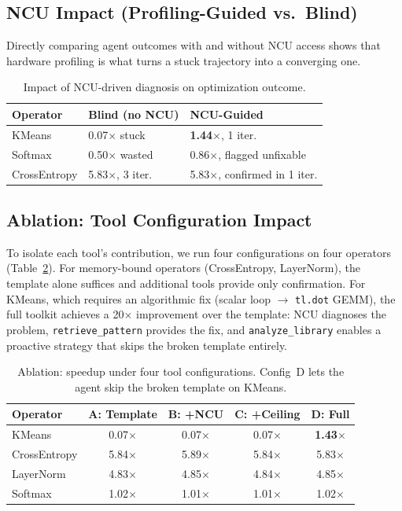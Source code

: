 \documentclass[sigconf,nonacm]{acmart}
\begin{document}
\subsection{NCU Impact (Profiling-Guided vs.\ Blind)}

Directly comparing agent outcomes with and without NCU access
shows that hardware profiling is what turns a stuck trajectory
into a converging one.

\begin{table}[h]
\centering
\caption{Impact of NCU-driven diagnosis on optimization outcome.}
\label{tab:ncu-impact}
\setlength{\tabcolsep}{3.5pt}
\small
\begin{tabular}{lll}
\toprule
Operator & Blind (no NCU) & NCU-Guided \\
\midrule
KMeans       & 0.07$\times$ stuck   & \textbf{1.44$\times$}, 1 iter. \\
Softmax      & 0.50$\times$ wasted  & 0.86$\times$, flagged unfixable \\
CrossEntropy & 5.83$\times$, 3 iter.& 5.83$\times$, confirmed in 1 iter. \\
\bottomrule
\end{tabular}
\end{table}



\subsection{Ablation: Tool Configuration Impact}

To isolate each tool's contribution, we run four configurations
on four operators (Table~\ref{tab:ablation}).
For memory-bound operators (CrossEntropy, LayerNorm), the template
alone suffices and additional tools provide only confirmation.
For KMeans, which requires an algorithmic fix (scalar loop $\to$
\texttt{tl.dot} GEMM), the full toolkit achieves a 20$\times$
improvement over the template: NCU diagnoses the problem,
\texttt{retrieve\_pattern} provides the fix, and
\texttt{analyze\_library} enables a proactive strategy that skips
the broken template entirely.

\begin{table}[h]
\centering
\caption{Ablation: speedup under four tool configurations.
Config~D lets the agent skip the broken template on KMeans.}
\label{tab:ablation}
\setlength{\tabcolsep}{3.5pt}
\small
\begin{tabular}{lcccc}
\toprule
Operator & A: Template & B: +NCU & C: +Ceiling & D: Full \\
\midrule
KMeans       & 0.07$\times$ & 0.07$\times$ & 0.07$\times$ & \textbf{1.43$\times$} \\
CrossEntropy & 5.84$\times$ & 5.89$\times$ & 5.84$\times$ & 5.83$\times$ \\
LayerNorm    & 4.83$\times$ & 4.85$\times$ & 4.84$\times$ & 4.85$\times$ \\
Softmax      & 1.02$\times$ & 1.01$\times$ & 1.01$\times$ & 1.02$\times$ \\
\bottomrule
\end{tabular}
\end{table}
\end{document}
